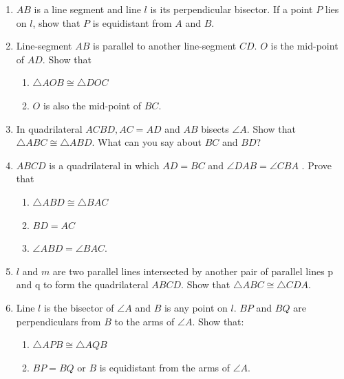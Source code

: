 \begin{enumerate}[label=\arabic*.,ref=\thesubsection.\theenumi]
%
\item $AB$ is a line segment and line $l$ is its perpendicular bisector. If a point $P$ lies on $l$, show that $P$ is equidistant from $A$ and $B$.
\item Line-segment $AB$ is parallel to another line-segment $CD$. $O$ is the mid-point of $AD$. Show that 
\begin{enumerate}
\item  $\triangle AOB \cong \triangle DOC$ 
\item  $O$ is also the mid-point of $BC$.
\end{enumerate}
%
\item In quadrilateral $ACBD, AC = AD$ and $AB$ bisects $\angle  A$. Show that $\triangle  ABC \cong \triangle  ABD$. What can you say about $BC$ and $BD$?
\label{prob:8.1.23}

%
\item $ABCD$ is a quadrilateral in which $AD = BC$ and $\angle  DAB = \angle  CBA$ . Prove that
\begin{enumerate}
\item  $\triangle  ABD \cong  \triangle  BAC $
\item $ BD = AC $
\item  $\angle  ABD = \angle  BAC$.
\end{enumerate}
%
\item $l$ and $m$ are two parallel lines intersected by another pair of parallel lines p and q 
to form the quadrilateral $ABCD$. Show that $\triangle  ABC \cong  \triangle  CDA$.
%
\item Line $l$ is the bisector of $ \angle  A$ and $B$ is any point on $l$. $BP$ and $BQ$ are perpendiculars from $B$ to the arms of $\angle  A$. Show that: 
\begin{enumerate}
\item  $\triangle  APB \cong  \triangle  AQB$ 
\item  $BP = BQ$ or $B$ is equidistant from the arms of $\angle  A$.
\end{enumerate}
%

\end{enumerate}

